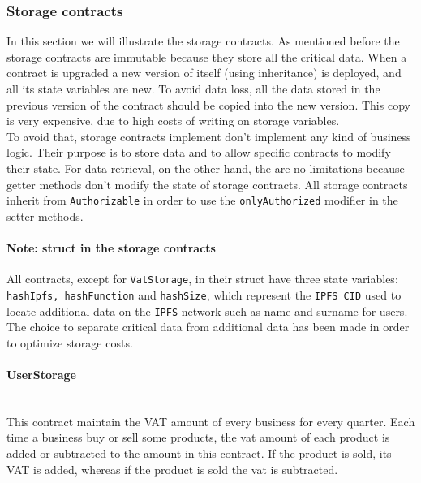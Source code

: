 \hypertarget{st}{\subsubsection{Storage contracts}}
In this section we will illustrate the storage contracts. As mentioned before the storage contracts are immutable because they store all the critical data. When a contract is upgraded a new version of itself (using inheritance) is deployed, and all its state variables are new. To avoid data loss, all the data stored in the previous version of the contract should be copied into the new version. This copy is very expensive, due to high costs of writing on storage variables.\\
To avoid that, storage contracts implement don't implement any kind of business logic. Their purpose is to store data and to allow specific contracts to modify their state. For data retrieval, on the other hand, the are no limitations because getter methods don't modify the state of storage contracts.
All storage contracts inherit from \texttt{Authorizable} in order to use the \texttt{onlyAuthorized} modifier in the setter methods.
\paragraph*{Note: struct in the storage contracts}
All contracts, except for \texttt{VatStorage}, in their struct have three state variables: \texttt{hashIpfs, hashFunction} and \texttt{hashSize}, which represent the \texttt{IPFS CID} used to locate additional data on the \texttt{IPFS} network such as name and surname for users. The choice to separate critical data from additional data has been made in order to optimize storage costs.
\pagebreak
\paragraph{UserStorage}\mbox{}\\

\noindent This contract maintain the VAT amount of every business for every quarter. Each time a business buy or sell some products, the vat amount of each product is added or subtracted to the amount in this contract. If the product is sold, its VAT is added, whereas if the product is sold the vat is subtracted. \\

